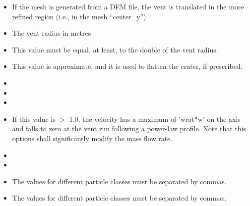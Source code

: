 \begin{itemize}
\item
{}
{If the mesh is generated from a DEM file, the vent is translated in the more refined region
(i.e., in the mesh ``center\_y'')}

\item
{}
{The vent radius in metres}

\item
{}
{This value must be equal, at least, to the double of the vent radius.}

\item
{}
{This value is approximate, and it is used to flatten the crater, if prescribed.}

\item
{}
{}

\item
{}
{}

\item
{}
{}

\item
{}
{If this value is $>$ 1.0, the velocity has a maximum of 'wrat*w' on the axis and falls to zero at the vent rim
following a power-law profile. Note that this options shall significantly modify the mass flow rate.}

\item
{}
{}

\item
{}

\item
{}
{The values for different particle classes must be separated by commas.}

\item
{}
{The values for different particle classes must be separated by commas.}


\end{itemize}
